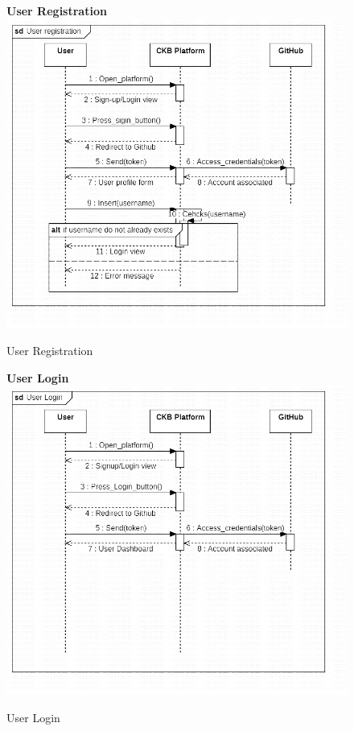 \begin{enumerate}[label=\textbf{[UC\arabic*]}]
\begin{enumerate}[label=\textbf{[UC\arabic*]}]

    \begin{figure}[!h]
    \item \textbf{User Registration}
    \centering
    \includegraphics[width=\textwidth]{Images/User registration.jpg}
    \caption{User Registration}
    \label{fig:enter-label}
    \end{figure}

    \begin{figure}
    \item \textbf{User Login}
    \centering
    \includegraphics[width= \textwidth]{Images/User login.jpeg}
    \caption{User Login}
    \label{fig:enter-label}
    \end{figure}




\end{enumerate}
\end{enumerate}
